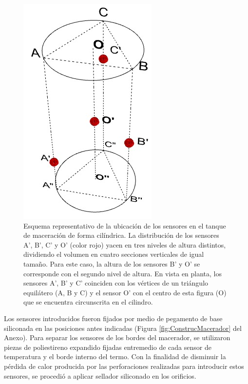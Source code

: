         \begin{figure}[h]
            \centering
            \includegraphics[scale=0.5]{Pruebas/UbicacionSensoresEnTanque-04.jpeg}
            \caption{Esquema representativo de la ubicación de los sensores en el tanque de maceración de forma cilíndrica. La distribución de los sensores A', B', C' y O' (color rojo) yacen en tres niveles de altura distintos, dividiendo el volumen en cuatro secciones verticales de igual tamaño. Para este caso, la altura de los sensores B' y O' se corresponde con el segundo nivel de altura. En vista en planta, los sensores A', B' y C' coinciden con los vértices de un triángulo equilátero (A, B y C) y el sensor O' con el centro de esta figura (O) que se encuentra circunscrita en el cilindro.}
            \label{fig:SensoresEnTanque}
        \end{figure}
        
        \par Los sensores introducidos fueron fijados por medio de pegamento de base siliconada en las posiciones antes indicadas (Figura \ref{fig:ConstrucMacerador} del Anexo). Para separar los sensores de los bordes del macerador, se utilizaron piezas de poliestireno expandido fijadas entremedio de cada sensor de temperatura y el borde interno del termo.
        Con la finalidad de disminuir la pérdida de calor producida por las perforaciones realizadas para introducir estos sensores, se procedió a aplicar sellador siliconado  en los orificios.
        
